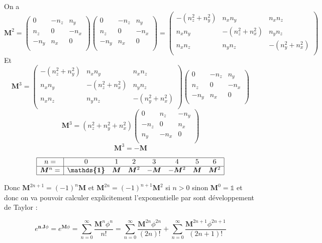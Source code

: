 \documentclass[12pt,a4paper]{article}
\newcommand{\unit}
{
\bm{\mathds{1}}
}
\begin{document}
	On a 
	\[
	\bm{M}^2=\begin{pmatrix}
	0&-n_z&n_y\\
	n_z&0&-n_x\\
	-n_y&n_x&0\\
	\end{pmatrix}\begin{pmatrix}
	0&-n_z&n_y\\
	n_z&0&-n_x\\
	-n_y&n_x&0\\
	\end{pmatrix}=\begin{pmatrix}
	-(n_z^2+n_y^2)&n_x n_y& n_x n_z\\
	n_x n_y&-(n_z^2+n_x^2)& n_y n_z\\
	n_x n_z&n_y n_z&-(n_y^2+n_x^2)\\
	\end{pmatrix}
	\]
	Et 
	\[
	\bm{M}^3=\begin{pmatrix}
	-(n_z^2+n_y^2)&n_x n_y& n_x n_z\\
	n_x n_y&-(n_z^2+n_x^2)& n_y n_z\\
	n_x n_z&n_y n_z&-(n_y^2+n_x^2)\\
	\end{pmatrix}\begin{pmatrix}
	0&-n_z&n_y\\
	n_z&0&-n_x\\
	-n_y&n_x&0\\
	\end{pmatrix}
	\]
	\[
	\bm{M}^3=(n_z^2+n_y^2+n_x^2)
	\begin{pmatrix}
	0&n_z&-n_y\\
	-n_z&0&n_x\\
	n_y&-n_x&0\\
	\end{pmatrix}
	\]
	\[
	\boxed{\bm{M}^3=-\bm{M}}
	\]
	
	\[
		\begin{array}{|c|ccccccc|}
		\hline
		n=&0&1&2&3&4&5&6\\
		\hline
		\bm{M}^n=&\unit&\bm{M}&\bm{M}^2&-\bm{M}&-\bm{M}^2&\bm{M}&\bm{M}^2\\
		\hline
		\end{array}
	\]
	
	
	Donc $\bm{M}^{2n+1}=(-1)^{n} \bm{M}$ et $\bm{M}^{2n}=(-1)^{n+1} \bm{M}^2$ si $n>0$ sinon $\bm{M}^0=\unit$ et donc on va pouvoir calculer explicitement l'exponentielle par sont développement de Taylor :
	
	\[
	e^{\bm{n}.\bm{J}\phi}=e^{\bm{M}\phi} = \sum_{n=0}^{\infty} \frac{\bm{M}^n\phi^n}{n!}=\sum_{n=0}^{\infty} \frac{\bm{M}^{2n}\phi^{2n}}{(2n)!} + \sum_{n=0}^{\infty} \frac{\bm{M}^{2n+1}\phi^{2n+1}}{(2n+1)!}
	\]
	
\end{document}

